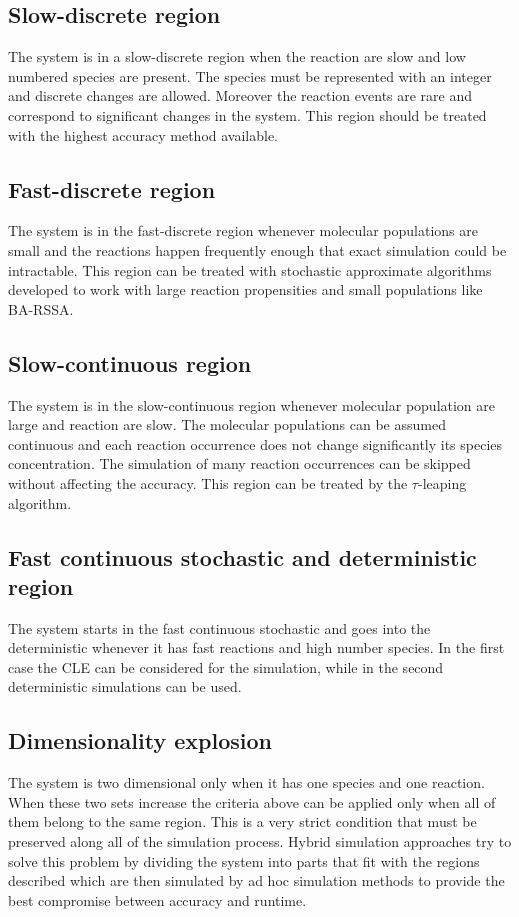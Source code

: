   \subsection{Slow-discrete region}
  The system is in a slow-discrete region when the reaction are slow and low numbered species are present.
  The species must be represented with an integer and discrete changes are allowed.
  Moreover the reaction events are rare and correspond to significant changes in the system.
  This region should be treated with the highest accuracy method available.

  \subsection{Fast-discrete region}
  The system is in the fast-discrete region whenever molecular populations are small and the reactions happen frequently enough that exact simulation could be intractable.
  This region can be treated with stochastic approximate algorithms developed to work with large reaction propensities and small populations like BA-RSSA.

  \subsection{Slow-continuous region}
  The system is in the slow-continuous region whenever molecular population are large and reaction are slow.
  The molecular populations can be assumed continuous and each reaction occurrence does not change significantly its species concentration.
  The simulation of many reaction occurrences can be skipped without affecting the accuracy.
  This region can be treated by the $\tau$-leaping algorithm.

  \subsection{Fast continuous stochastic and deterministic region}
  The system starts in the fast continuous stochastic and goes into the deterministic whenever it has fast reactions and high number species.
  In the first case the CLE can be considered for the simulation, while in the second deterministic simulations can be used.

  \subsection{Dimensionality explosion}
  The system is two dimensional only when it has one species and one reaction.
  When these two sets increase the criteria above can be applied only when all of them belong to the same region.
  This is a very strict condition that must be preserved along all of the simulation process.
  Hybrid simulation approaches try to solve this problem by dividing the system into parts that fit with the regions described which are then simulated by ad hoc simulation methods to provide the best compromise between accuracy and runtime.

